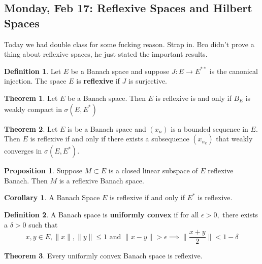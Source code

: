 \documentclass[10pt, oneside]{article}
\theoremstyle{definition}
\newtheorem{thm}{Theorem}
\newtheorem{defn}{Definition}
\newtheorem{prop}{Proposition}
\newtheorem{cor}{Corollary}
\begin{document}
\newpage
\subsection{Monday, Feb 17: Reflexive Spaces and Hilbert Spaces}
Today we had double class for some fucking reason. Strap in. Bro didn't prove a thing about reflexive spaces, he just stated the important results. 

\begin{defn}
    Let $E$ be a Banach space and suppose $J: E\to E^{**}$ is the canonical injection. The space $E$ is \textbf{reflexive} if $J$ is surjective.
\end{defn}
\begin{thm}
    Let $E$ be a Banach space. Then $E$ is reflexive is and only if $B_E$ is weakly compact in $\sigma(E, E^*)$
\end{thm}
\begin{thm}
    Let $E$ is be a Banach space and $(x_n)$ is a bounded sequence in $E.$ Then $E$ is reflexive if and only if there exists a subsequence $(x_{n_k})$ that weakly converges in $\sigma(E, E^*).$
\end{thm}

\begin{prop}
    Suppose $M\subset E$ is a closed linear subspace of $E$ reflexive Banach. Then $M$ is a reflexive Banach space. 
\end{prop}

\begin{cor}
    A Banach Space $E$ is reflexive if and only if $E^*$ is reflexive.
\end{cor}

\begin{defn}
    A Banach space is \textbf{uniformly convex} if for all $\epsilon>0,$ there exists a $\delta>0$ such that 
    \[x,y \in E, \|x\|, \|y\|\leq 1 \text{ and } \|x-y\| > \epsilon \implies \|\frac{x + y}{2}\| < 1-\delta\]
\end{defn}
\begin{thm}
    Every uniformly convex Banach space is reflexive.
\end{thm}
\end{document}
